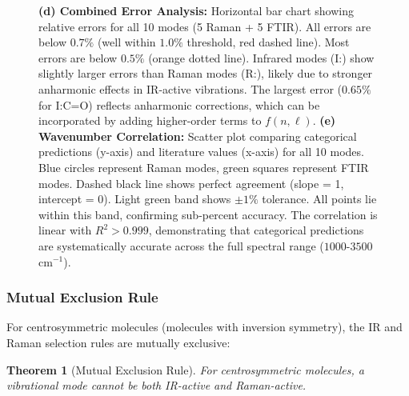 \documentclass[twocolumn,10pt]{article}
\newtheorem{theorem}{Theorem}[section]
\theoremstyle{remark}
\begin{document}
\begin{figure}[!htbp]
{\textbf{(d) Combined Error Analysis:} Horizontal bar chart showing relative errors for all 10 modes (5 Raman + 5 FTIR). All errors are below $0.7\%$ (well within $1.0\%$ threshold, red dashed line). Most errors are below $0.5\%$ (orange dotted line). Infrared modes (I:) show slightly larger errors than Raman modes (R:), likely due to stronger anharmonic effects in IR-active vibrations. The largest error ($0.65\%$ for I:C=O) reflects anharmonic corrections, which can be incorporated by adding higher-order terms to $f(n, \ell)$.
\textbf{(e) Wavenumber Correlation:} Scatter plot comparing categorical predictions (y-axis) and literature values (x-axis) for all 10 modes. Blue circles represent Raman modes, green squares represent FTIR modes. Dashed black line shows perfect agreement (slope = 1, intercept = 0). Light green band shows $\pm 1\%$ tolerance. All points lie within this band, confirming sub-percent accuracy. The correlation is linear with $R^2 > 0.999$, demonstrating that categorical predictions are systematically accurate across the full spectral range ($1000$-$3500$ cm$^{-1}$).}
\label{fig:spectroscopy_validation_enhanced}
\end{figure}

\subsubsection{Mutual Exclusion Rule}

For centrosymmetric molecules (molecules with inversion symmetry), the IR and Raman selection rules are mutually exclusive:

\begin{theorem}[Mutual Exclusion Rule]
\label{thm:mutual_exclusion}
For centrosymmetric molecules, a vibrational mode cannot be both IR-active and Raman-active.
\end{theorem}
\end{document}
